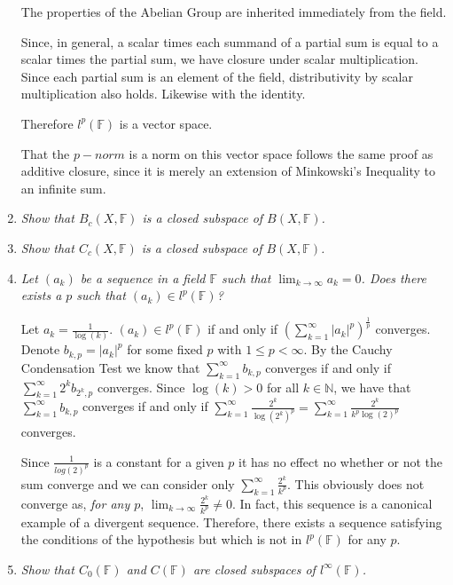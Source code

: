 \documentclass[11pt]{article}
\begin{document}
\begin{enumerate}
The properties of the Abelian Group are inherited immediately from the field.

Since, in general, a scalar times each summand of a partial sum is equal to a scalar times the partial sum, we have closure under scalar multiplication.  Since each partial sum is an element of the field, distributivity by scalar multiplication also holds.  Likewise with the identity.

Therefore $l^p(\mathbb{F})$ is a vector space.

That the $p-norm$ is a norm on this vector space follows the same proof as additive closure, since it is merely an extension of Minkowski's Inequality to an infinite sum.

\item \emph{Show that $B_c(X,\mathbb{F})$ is a closed subspace of $B(X,\mathbb{F})$.}

\item \emph{Show that $C_c(X,\mathbb{F})$ is a closed subspace of $B(X,\mathbb{F})$.}

\item \emph{Let $(a_k)$ be a sequence in a field $\mathbb{F}$ such that $\lim_{k \rightarrow \infty} a_k = 0$.  Does there exists a $p$ such that $(a_k) \in l^p(\mathbb{F})$?}

Let $a_k = \frac{1}{\log(k)}$.  $(a_k) \in l^p(\mathbb{F})$ if and only if $\left(\sum_{k=1}^{\infty}|a_k|^p\right)^{\frac{1}{p}}$ converges.  Denote $b_{k,p} = |a_k|^p$ for some fixed $p$ with $1 \leq p < \infty$.  By the Cauchy Condensation Test we know that $\sum_{k=1}^{\infty}b_{k,p}$ converges if and only if $\sum_{k=1}^{\infty}2^kb_{2^k,p}$ converges.  Since $\log(k) > 0$ for all $k \in \mathbb{N}$, we have that $\sum_{k=1}^{\infty}b_{k,p}$ converges if and only if $\sum_{k=1}^{\infty}\frac{2^k}{\log(2^k)^p} = \sum_{k=1}^{\infty}\frac{2^k}{k^p\log(2)^p}$ converges.

Since $\frac{1}{log(2)^p}$ is a constant for a given $p$ it has no effect no whether or not the sum converge and we can consider only $\sum_{k=1}^{\infty}\frac{2^k}{k^p}$.  This obviously does not converge as, \emph{for any $p$}, $\lim_{k \rightarrow \infty}\frac{2^k}{k^p} \neq 0$.  In fact, this sequence is a canonical example of a divergent sequence.  Therefore, there exists a sequence satisfying the conditions of the hypothesis but which is not in $l^p(\mathbb{F})$ for any $p$.

\item \emph{Show that $C_0(\mathbb{F})$ and $C(\mathbb{F})$ are closed subspaces of $l^{\infty}(\mathbb{F})$.}


\end{enumerate}
\end{document}
